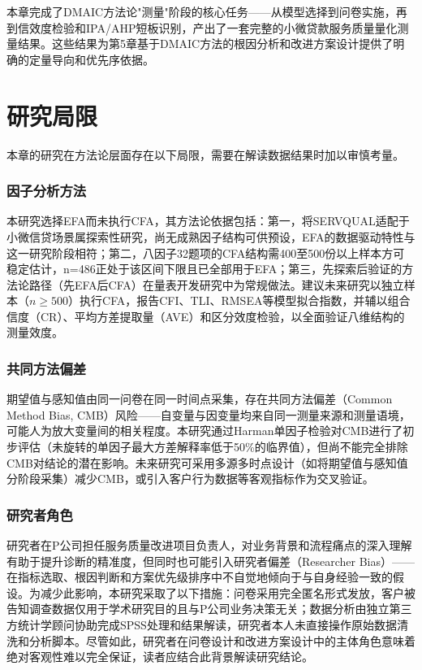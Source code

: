 本章完成了DMAIC方法论"测量"阶段的核心任务——从模型选择到问卷实施，再到信效度检验和IPA/AHP短板识别，产出了一套完整的小微贷款服务质量量化测量结果。这些结果为第5章基于DMAIC方法的根因分析和改进方案设计提供了明确的定量导向和优先序依据。\par

\section{研究局限}

本章的研究在方法论层面存在以下局限，需要在解读数据结果时加以审慎考量。\par

\subsubsection{因子分析方法}

本研究选择EFA而未执行CFA，其方法论依据包括：第一，将SERVQUAL适配于小微信贷场景属探索性研究，尚无成熟因子结构可供预设，EFA的数据驱动特性与这一研究阶段相符；第二，八因子32题项的CFA结构需400至500份以上样本方可稳定估计\cite{ref14}，n=486正处于该区间下限且已全部用于EFA；第三，先探索后验证的方法论路径（先EFA后CFA）在量表开发研究中为常规做法。建议未来研究以独立样本（$n \geq 500$）执行CFA，报告CFI、TLI、RMSEA等模型拟合指数，并辅以组合信度（CR）、平均方差提取量（AVE）和区分效度检验，以全面验证八维结构的测量效度。\par

\subsubsection{共同方法偏差}

期望值与感知值由同一问卷在同一时间点采集，存在共同方法偏差（Common Method Bias, CMB）风险——自变量与因变量均来自同一测量来源和测量语境，可能人为放大变量间的相关程度。本研究通过Harman单因子检验对CMB进行了初步评估（未旋转的单因子最大方差解释率低于50\%的临界值），但尚不能完全排除CMB对结论的潜在影响。未来研究可采用多源多时点设计（如将期望值与感知值分阶段采集）减少CMB，或引入客户行为数据等客观指标作为交叉验证。\par

\subsubsection{研究者角色}

研究者在P公司担任服务质量改进项目负责人，对业务背景和流程痛点的深入理解有助于提升诊断的精准度，但同时也可能引入研究者偏差（Researcher Bias）——在指标选取、根因判断和方案优先级排序中不自觉地倾向于与自身经验一致的假设。为减少此影响，本研究采取了以下措施：问卷采用完全匿名形式发放，客户被告知调查数据仅用于学术研究目的且与P公司业务决策无关；数据分析由独立第三方统计学顾问协助完成SPSS处理和结果解读，研究者本人未直接操作原始数据清洗和分析脚本。尽管如此，研究者在问卷设计和改进方案设计中的主体角色意味着绝对客观性难以完全保证，读者应结合此背景解读研究结论。\par

